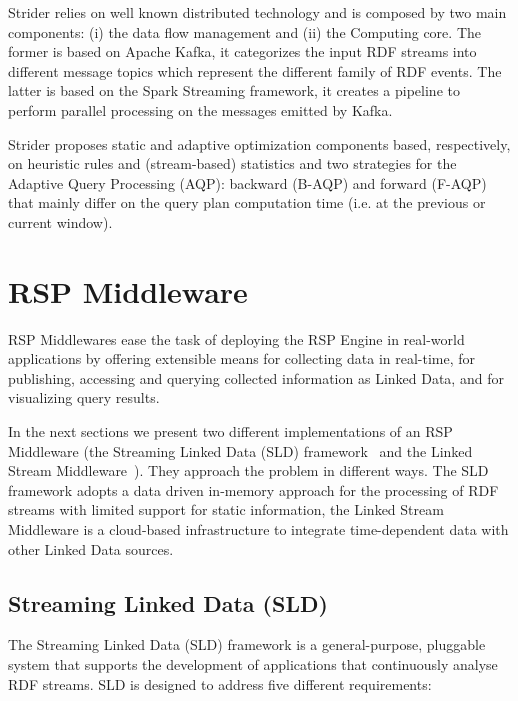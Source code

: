 Strider relies on well known distributed technology and is composed by two main components: (i) the data flow management and (ii) the Computing core. 
The former is based on Apache Kafka, it categorizes the input RDF streams into different message topics which represent the different family of RDF events.
The latter is based on the Spark Streaming framework, it creates a pipeline to perform parallel processing on the messages emitted by Kafka.

Strider proposes static and adaptive optimization components based, respectively, on heuristic rules and (stream-based) statistics and two strategies for the Adaptive Query Processing (AQP): backward (B-AQP) and forward (F-AQP) that mainly differ on the query plan computation time (i.e. at the previous or current window).

\section{RSP Middleware}\label{sec:rsp-mid}
RSP Middlewares ease the task of deploying the RSP Engine in real-world applications by offering extensible means for collecting data in real-time, for publishing, accessing and querying collected information as Linked Data, and for visualizing query results. 

In the next sections we present two different implementations of an RSP Middleware (the Streaming Linked Data (SLD) framework~\cite{DBLP:conf/semweb/BalduiniVDTPC13} and the Linked Stream Middleware~\cite{DBLP:journals/ws/PhuocNPH12}). They approach the problem in different ways. 
The SLD framework adopts a data driven in-memory approach for the processing of RDF streams with limited support for static information, the Linked Stream Middleware is a cloud-based infrastructure to integrate time-dependent data with other Linked Data sources. 

\subsection{Streaming Linked Data (SLD)} \label{sec:sld}
The Streaming Linked Data (SLD) framework is a general-purpose, pluggable system that supports the development of applications that continuously analyse RDF streams.
SLD is designed to address five different requirements:


